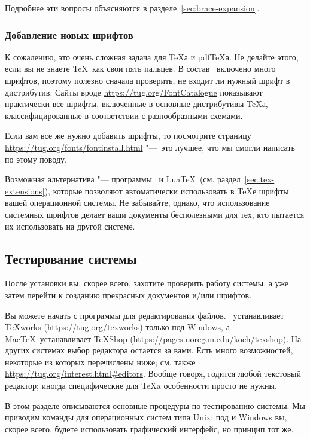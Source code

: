 \documentclass{article}
\begin{document}
Подробнее эти вопросы объясняются в
разделе~\ref{sec:brace-expansion}.  

\subsubsection{Добавление новых шрифтов}

К сожалению, это очень сложная задача для \TeX{}а и pdf\TeX{}а.  Не
делайте этого, если вы не знаете \TeX\ как свои пять пальцев.  В
состав \TL\ включено много шрифтов, поэтому полезно сначала проверить,
не входит ли нужный шрифт в дистрибутив.  Сайты вроде
\url{https://tug.org/FontCatalogue} показывают практически все шрифты,
включенные в основные дистрибутивы \TeX{}а, классифицированные в
соответствии с разнообразными схемами.

Если вам все же нужно добавить шрифты, то посмотрите 
страницу \url{https://tug.org/fonts/fontinstall.html} "---~это лучшее,
что мы смогли написать по этому поводу. 

Возможная альтернатива "--- программы \XeTeX\ и Lua\TeX\ (см.
раздел~\ref{sec:tex-extensions}), которые позволяют автоматически
использовать в \TeX е шрифты вашей операционной системы.  Не
забывайте, однако, что использование системных шрифтов делает ваши
документы бесполезными для тех, кто пытается их использовать на другой
системе.  



\subsection{Тестирование системы}
\label{sec:test-install}


После установки \TL{} вы, скорее всего, захотите проверить работу
системы, а уже затем перейти к созданию прекрасных документов и/или
шрифтов.

Вы можете начать с программы для редактирования файлов.  \TL\
устанавливает  \TeX{}works (\url{https://tug.org/texworks})
только под Windows, а Mac\TeX\ устанавливает TeXShop
(\url{https://pages.uoregon.edu/koch/texshop}).  На других системах
выбор редактора остается за вами.  Есть много возможностей, некоторые
из которых перечислены ниже; см. также
\url{https://tug.org/interest.html#editors}.  Вообще говоря,
годится любой текстовый редактор; иногда специфические для \TeX a
особенности просто не нужны.


В этом разделе описываются основные процедуры по тестированию системы.
Мы приводим команды для операционных систем типа Unix; под \MacOSX{} и
Windows вы, скорее всего, будете использовать графический интерфейс,
но принцип тот же.
\end{document}
